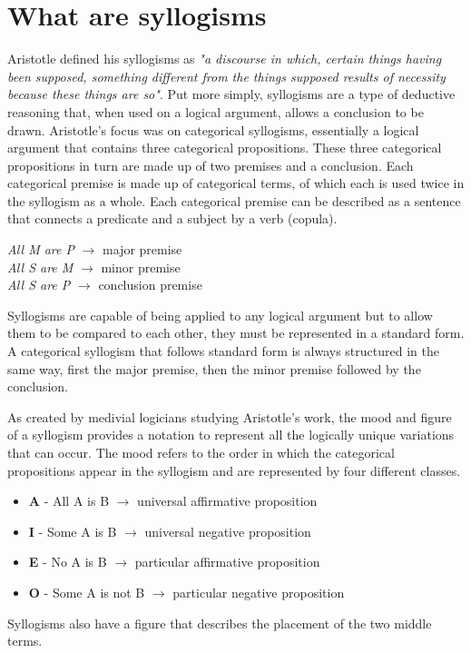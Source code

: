 \documentclass[12pt,a4paper]{report}
\newenvironment{tightcenter}{%
  \setlength\topsep{0pt}
  \setlength\parskip{0pt}
  \begin{center}
}{%
  \end{center}
}
\begin{document}
\section{What are syllogisms}
Aristotle defined his syllogisms as \textit{"a discourse in which, certain things having been supposed, something different from the things supposed results of necessity because these things are so"}. Put more simply, syllogisms are a type of deductive reasoning that, when used on a logical argument, allows a conclusion to be drawn. Aristotle's focus was on categorical syllogisms, essentially a  logical argument that contains three categorical propositions. These three categorical propositions in turn are made up of two premises and a conclusion. Each categorical premise is made up of categorical terms, of which each is used twice in the syllogism as a whole. Each categorical premise can be described as a sentence that connects a predicate and a subject by a verb (copula). 
\bigbreak
\begin{tightcenter}
\textit{All M are P} $\rightarrow$ major premise\\
\textit{All S are M} $\rightarrow$ minor premise\\
\textit{All S are P} $\rightarrow$ conclusion premise\\
\end{tightcenter}
\bigbreak
Syllogisms are capable of being applied to any logical argument but to allow them to be compared to each other, they must be represented in a standard form. A categorical syllogism that follows standard form is always structured in the same way, first the major premise, then the minor premise followed by the conclusion. 

As created by medivial logicians studying Aristotle's work, the mood and figure of a syllogism provides a notation to represent all the logically unique variations that can occur. The mood refers to the order in which the categorical propositions appear in the syllogism and are represented by four different classes.
\begin{itemize}
\item \textbf{A} - All A is B $\rightarrow$ universal affirmative proposition
\item \textbf{I} - Some A is B $\rightarrow$ universal negative proposition
\item \textbf{E} - No A is B $\rightarrow$ particular affirmative proposition
\item \textbf{O} - Some A is not B  $\rightarrow$  particular negative proposition
\end{itemize}
Syllogisms also have a figure that describes the placement of the two middle terms.
\end{document}
